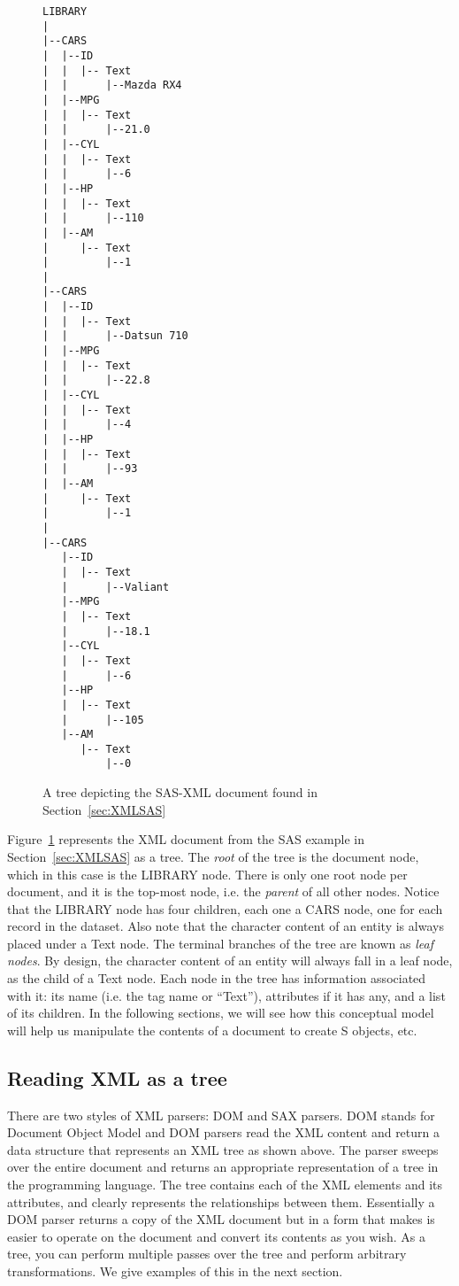 \begin{figure}
{\footnotesize{
\begin{verbatim}
LIBRARY   
|
|--CARS 
|  |--ID
|  |  |-- Text
|  |      |--Mazda RX4 
|  |--MPG
|  |  |-- Text
|  |      |--21.0
|  |--CYL
|  |  |-- Text
|  |      |--6
|  |--HP
|  |  |-- Text
|  |      |--110
|  |--AM
|     |-- Text
|         |--1
|
|--CARS 
|  |--ID
|  |  |-- Text
|  |      |--Datsun 710
|  |--MPG
|  |  |-- Text
|  |      |--22.8
|  |--CYL
|  |  |-- Text
|  |      |--4
|  |--HP
|  |  |-- Text
|  |      |--93
|  |--AM
|     |-- Text
|         |--1
|
|--CARS 
   |--ID
   |  |-- Text
   |      |--Valiant 
   |--MPG
   |  |-- Text
   |      |--18.1
   |--CYL
   |  |-- Text
   |      |--6
   |--HP
   |  |-- Text
   |      |--105
   |--AM
      |-- Text
          |--0
\end{verbatim}
}}
\caption{A tree depicting the SAS-XML document found in 
Section~\ref{sec:XMLSAS}}
\label{fig:SASXMLtree}
\end{figure}

Figure~\ref{fig:SASXMLtree}
represents the XML document from the SAS example
in Section~\ref{sec:XMLSAS} as a tree.
The \textit{root} of the tree is the document node,
which in this case is the LIBRARY node.
There is only one root node per document, and 
it is the top-most node, i.e. the \textit{parent} of all other nodes. 
Notice that the LIBRARY node has four children,
each one a CARS node, one for each record in the dataset.
Also note that the character content of an entity is 
always placed under a Text node. 
The terminal branches of the tree are known as \textit{leaf nodes}.  
By design, the character content of an entity will always fall in a leaf node,
as the child of a Text node. 
Each node in the tree has information associated with it:
its name (i.e. the tag name or ``Text''), attributes if it has any, 
and  a list of its children.
In the following sections, we will see how this conceptual
model will help us manipulate the contents of a document to
create S objects, etc.


\subsection{Reading XML as a tree}
There are two styles of XML parsers: DOM and SAX parsers.  
DOM stands for Document Object Model and DOM
parsers read the XML content and return a data structure that
represents an XML tree as shown above.  
The parser sweeps over the entire document and returns an appropriate 
representation of a tree in the programming language.
The tree contains each of the XML elements and its attributes, and 
clearly represents the relationships between them. 
Essentially a DOM parser returns a copy of the XML document but
in a form that makes is easier to operate on the document 
and convert its contents as you wish. As a tree, you can perform multiple
passes over the tree and perform arbitrary transformations.
We give examples of this in the next section.

